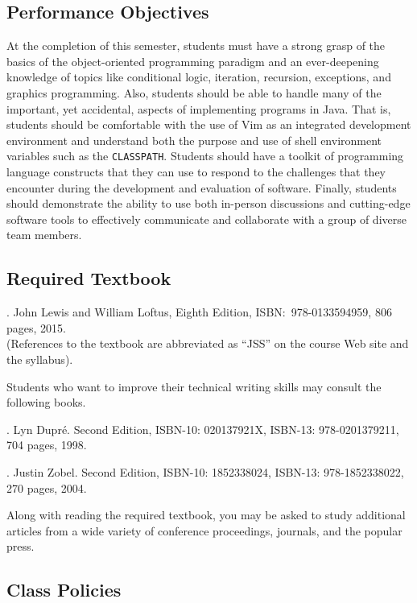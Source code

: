 \subsection*{Performance Objectives}

At the completion of this semester, students must have a strong grasp of the basics of the object-oriented programming
paradigm and an ever-deepening knowledge of topics like conditional logic, iteration, recursion, exceptions, and
graphics programming.  Also, students should be able to handle many of the important, yet accidental, aspects of
implementing programs in Java.  That is, students should be comfortable with the use of Vim as an integrated development
environment and understand both the purpose and use of shell environment variables such as the {\tt CLASSPATH}.
Students should have a toolkit of programming language constructs that they can use to respond to the challenges that
they encounter during the development and evaluation of software. Finally, students should demonstrate the ability to
use both in-person discussions and cutting-edge software tools to effectively communicate and collaborate with a group
of diverse team members.

\subsection*{Required Textbook}

. John Lewis and William Loftus,
Eighth Edition, ISBN:\ 978-0133594959, 806 pages, 2015. \\
(References to the textbook are abbreviated as ``JSS'' on the course Web site and the syllabus).

\noindent
Students who want to improve their technical writing skills may consult the following books.

. Lyn Dupr\'e. Second Edition,  ISBN-10: 020137921X,
ISBN-13: 978-0201379211, 704 pages, 1998.

.  Justin Zobel. Second Edition,  ISBN-10: 1852338024, ISBN-13:
978-1852338022, 270 pages, 2004.

\noindent Along with reading the required textbook, you may be asked to study additional articles from a wide variety of
conference proceedings, journals, and the popular press.

\subsection*{Class Policies}

